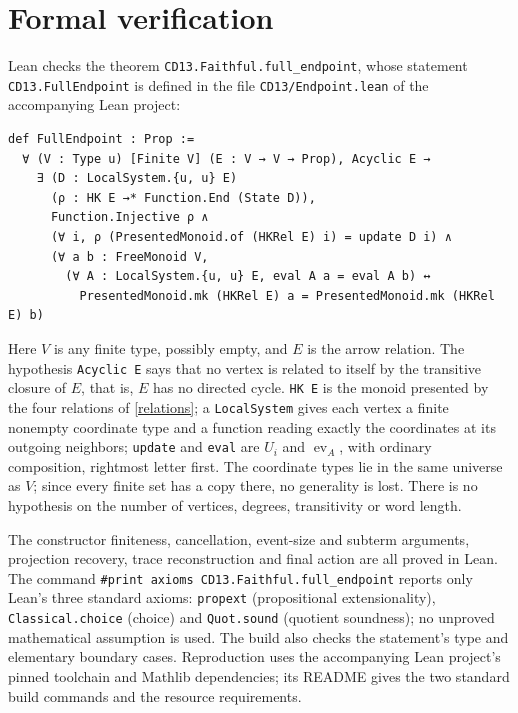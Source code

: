 \documentclass[11pt]{article}
\newcommand{\ev}{\operatorname{ev}}
\begin{document}
\section{Formal verification}
Lean checks the theorem \texttt{CD13.Faithful.full\_endpoint}, whose
statement \texttt{CD13.FullEndpoint} is defined in the file
\texttt{CD13/Endpoint.lean} of the accompanying Lean project:
{\small
\begin{verbatim}
def FullEndpoint : Prop :=
  ∀ (V : Type u) [Finite V] (E : V → V → Prop), Acyclic E →
    ∃ (D : LocalSystem.{u, u} E)
      (ρ : HK E →* Function.End (State D)),
      Function.Injective ρ ∧
      (∀ i, ρ (PresentedMonoid.of (HKRel E) i) = update D i) ∧
      (∀ a b : FreeMonoid V,
        (∀ A : LocalSystem.{u, u} E, eval A a = eval A b) ↔
          PresentedMonoid.mk (HKRel E) a = PresentedMonoid.mk (HKRel E) b)
\end{verbatim}
}
\noindent Here $V$ is any finite type, possibly empty, and $E$ is the arrow
relation. The hypothesis \texttt{Acyclic E} says that no vertex is related
to itself by the transitive closure of $E$, that is, $E$ has no directed
cycle. \texttt{HK E} is the monoid presented by the four relations of
\eqref{relations}; a \texttt{LocalSystem} gives each vertex a finite
nonempty coordinate type and a function reading exactly the coordinates at
its outgoing neighbors; \texttt{update} and \texttt{eval} are $U_i$ and
$\ev_A$, with ordinary composition, rightmost letter first. The coordinate
types lie in the same universe as $V$; since every finite set has a copy
there, no generality is lost. There is no hypothesis on the number of
vertices, degrees, transitivity or word length.

The constructor finiteness, cancellation, event-size and subterm arguments,
projection recovery, trace reconstruction and final action are all proved
in Lean. The command
\texttt{\#print axioms CD13.Faithful.full\_endpoint} reports only Lean's
three standard axioms: \texttt{propext} (propositional extensionality),
\texttt{Classical.choice} (choice) and \texttt{Quot.sound} (quotient
soundness); no unproved mathematical
assumption is used. The build also checks the statement's type and
elementary boundary cases. Reproduction uses the accompanying Lean
project's pinned toolchain and Mathlib dependencies; its README gives the
two standard build commands and the resource requirements.
\end{document}
